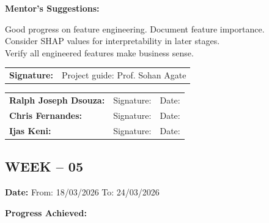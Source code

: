 \documentclass[12pt,a4paper]{article}
\begin{document}
\medskip

\noindent\textbf{Mentor's Suggestions:}

\medskip

\noindent Good progress on feature engineering. Document feature importance. \\
Consider SHAP values for interpretability in later stages. \\
Verify all engineered features make business sense.

\medskip

\noindent\begin{tabular}{p{4cm} p{6cm}}
\textbf{Signature:} & Project guide: Prof. Sohan Agate \\
\end{tabular}

\medskip

\noindent\begin{tabular}{p{3.5cm} p{5cm} p{3cm}}
\textbf{Ralph Joseph Dsouza:} & Signature: \underline{\hspace{4cm}} & Date: \underline{\hspace{2cm}} \\
\textbf{Chris Fernandes:} & Signature: \underline{\hspace{4cm}} & Date: \underline{\hspace{2cm}} \\
\textbf{Ijas Keni:} & Signature: \underline{\hspace{4cm}} & Date: \underline{\hspace{2cm}} \\
\end{tabular}

\newpage

\subsection*{WEEK – 05}
\vspace{0.3cm}

\textbf{Date:} From: 18/03/2026 To: 24/03/2026

\medskip

\noindent\textbf{Progress Achieved:}

\medskip
\end{document}
